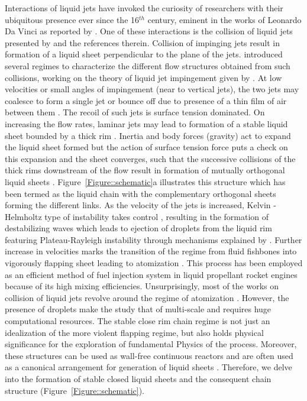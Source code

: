 \documentclass[%
aip,
sd,%
amsmath,amssymb,
preprint,%
author-year,%
]{revtex4-1}
\begin{document}
Interactions of liquid jets have invoked the curiosity of researchers with their ubiquitous presence \citep{eggers2008physics} ever since the 16$^{th}$ century, eminent in the works of Leonardo Da Vinci as reported by \cite{da1999codex}. One of these interactions is the collision of liquid jets presented by \cite{rayleigh1879capillary} and the references therein. Collision of impinging jets result in formation of a liquid sheet perpendicular to the plane of the jets. \cite{bush2004collision} introduced several regimes to characterize the different flow structures obtained from such collisions, working on the theory of liquid jet impingement given by \cite{taylor1960formation}. At low velocities or small angles of impingement (near to vertical jets), the two jets may coalesce to form a single jet or bounce off due to presence of a thin film of air between them \citep{wadhwa2013noncoalescence}. The recoil of such jets is surface tension dominated. On increasing the flow rates, laminar jets may lead to formation of a stable liquid sheet bounded by a thick rim \citep{yang2014liquid}. Inertia and body forces (gravity) act to expand the liquid sheet formed but the action of surface tension force puts a check on this expansion and the sheet converges, such that the successive collisions of the thick rims downstream of the flow result in formation of mutually orthogonal liquid sheets \citep{bush2004collision}. Figure~\ref{Figure::schematic}a illustrates this structure which has been termed as the liquid chain with the complementary orthogonal sheets forming the different links. As the velocity of the jets is increased, Kelvin - Helmholtz type of instability takes control \citep{bremond2006atomization}, resulting in the formation of destabilizing waves \citep{villermaux2002life} which leads to ejection of droplets from the liquid rim featuring Plateau-Rayleigh instability through mechanisms explained by \cite{lhuissier2011destabilization}. Further increase in velocities marks the transition of the regime from fluid fishbones into vigorously flapping sheet leading to atomization \citep{ibrahim1991impinging}. This process has been employed as an efficient method of fuel injection system in liquid propellant rocket engines because of its high mixing efficiencies. Unsurprisingly, most of the works on collision of liquid jets revolve around the regime of atomization \citep{miller1960distribution,ibrahim1991impinging,bremond2006atomization,chen2013high,zheng2015numerical}. However, the presence of droplets make the study that of multi-scale and requires huge computational resources. The stable close rim chain regime is not just an idealization of the more violent flapping regime, but also holds physical significance for the exploration of fundamental Physics of the process. Moreover, these structures can be used as wall-free continuous reactors \citep{erni2013free} and are often used as a canonical arrangement for generation of liquid sheets \citep{dombrowski1954photographic}. Therefore, we delve into the formation of stable closed liquid sheets and the consequent chain structure (Figure~\ref{Figure::schematic}). \\
\end{document}
